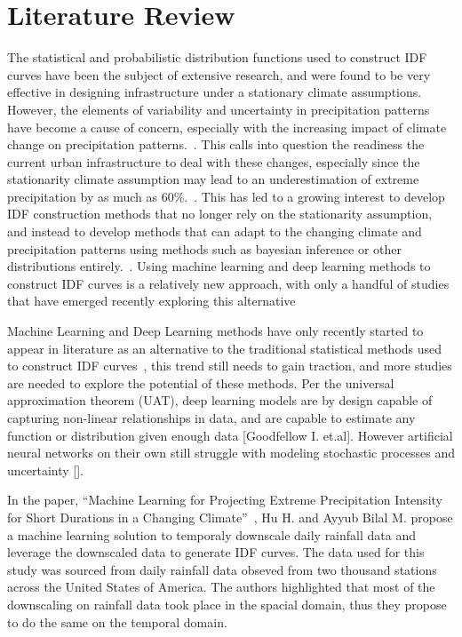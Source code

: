 \section{Literature Review}
The statistical and probabilistic distribution functions used to construct IDF curves have been the subject of extensive research, and were found to be very effective in designing infrastructure under a stationary climate assumptions. However, the elements of variability and uncertainty in precipitation patterns have become a cause of concern, especially with the increasing impact of climate change on precipitation patterns.~\cite{Cheng2014}. This calls into question the readiness the current urban infrastructure to deal with these changes, especially since the stationarity climate assumption may lead to an underestimation of extreme precipitation by as much as 60\%.~\cite{Cheng2014}. This has led to a growing interest to develop IDF construction methods that no longer rely on the stationarity assumption, and instead to develop methods that can adapt to the changing climate and precipitation patterns using methods such as bayesian inference or other distributions entirely.~\cite{Cheng2014}\cite{hess-2020-173}\cite{hess-27-2075-2023}\cite{hess-25-6133-2021}. Using machine learning and deep learning methods to construct IDF curves is a relatively new approach, with only a handful of studies that have emerged recently exploring this alternative~\cite{idfkoya}

\vspace{1em}

Machine Learning and Deep Learning methods have only recently started to appear in literature as an alternative to the traditional statistical methods used to construct IDF curves~\cite{idfkoya}, this trend still needs to gain traction, and more studies are needed to explore the potential of these methods. Per the universal approximation theorem (UAT), deep learning models are by design capable of capturing non-linear relationships in data, and are capable to estimate any function or distribution given enough data [Goodfellow I. et.al]. However artificial neural networks on their own still struggle with modeling stochastic processes and uncertainty [].

\vspace{1em}

In the paper, ``Machine Learning for Projecting Extreme Precipitation Intensity for Short Durations in a Changing Climate''~\cite{geosciences9050209}, Hu H. and Ayyub Bilal M. propose a machine learning solution to temporaly downscale daily rainfall data and leverage the downscaled data to generate IDF curves. The data used for this study was sourced from daily rainfall data obseved from two thousand stations across the United States of America. The authors highlighted that most of the downscaling on rainfall data took place in the spacial domain, thus they propose to do the same on the temporal domain.~\cite{geosciences9050209}

